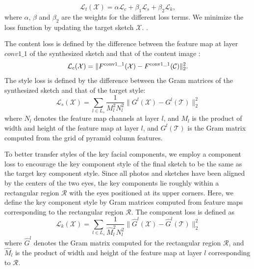 \documentclass[10pt,twocolumn,letterpaper]{article}
\def\redn[#1]{\textcolor{red}{}}
\begin{document}
\begin{equation}
\mathcal{L}_{t}( \mathcal{X} ) = \alpha \mathcal{L}_{c} + \beta_1 \mathcal{L}_{s} + \beta_2 \mathcal{L}_{k},
\label{eq:Total_loss}
\end{equation}
where $\alpha$, $\beta$ and $\beta_2$ are the weights for the different loss terms.
We minimize the loss function by updating the target sketch $\mathcal{X}$. \redn[without changing the VGG parameters(?)].

The content loss is defined by the difference between the feature map at layer $conv1\_1$ of the synthesized sketch and that of the content image :
\begin{equation}
\mathcal{L}_{c}( \mathcal{X} ) = \| {{F^{\rm{conv1\_1}}}( \mathcal{X} ) - {F^{\rm{conv1\_1}}}( \mathcal{C} )} \|_2^2.
\label{eq:content_loss}
\end{equation}
The style loss is defined by the difference between the Gram matrices of the synthesized sketch and that of the target style:
\begin{equation}
\mathcal{L}_{s} ( \mathcal{X} ) = \sum\limits_{l \in {L_s}} {\frac{1}{{M_l^2N_l^2}}\| {{G^l}(\mathcal{X} ) - G^l(\mathcal{T})} \|_2^2} 
\label{eq:Gram_loss}
\end{equation}
where $N_l$ denotes the feature map channels at layer $l$, and $M_l$ is the product of width and height of the feature map at layer $l$, and $G^l(\mathcal{T})$ is the Gram matrix computed from the grid of pyramid column features.  

To better transfer styles of the key facial components, we employ a component loss to encourage the key component style of the final sketch to be the same as the target key component style. Since all photos and sketches have been aligned by the centers of the two eyes, the key components lie roughly within a rectangular region $\mathcal{R}$ with the eyes positioned at its upper corners. Here, we define the key component style by Gram matrices computed from feature maps corresponding to  the rectangular region $\mathcal{R}$. The component loss is defined as
\begin{equation}
\mathcal{L}_{k} ( \mathcal{X} ) = \sum\limits_{l \in {L_s}} {\frac{1}{{\hat{M}_l^2{N}_l^2}}\| {{{\hat G}^l}( \mathcal{X} ) - {\hat G}^l(\mathcal{T})} \|_2^2} 
\label{eq:component_loss}
\end{equation}
where $\hat G^l$ denotes the Gram matrix computed for the rectangular region $\mathcal R$, and $\hat{M}_l$ is the product of width and height of the feature map at layer $l$ corresponding to $\mathcal R$. 
\end{document}
